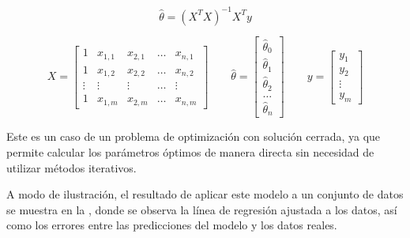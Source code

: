 \begin{equation}
    \label{eq:ols}
        \hat{\theta} = \left(X^T X\right)^{-1} X^T y
\end{equation}

\begin{equation}
    \label{eq:ols_matrices}
      X =
        \begin{bmatrix}
        1 & x_{1,1} & x_{2,1} & \dots & x_{n,1} \\
        1 & x_{1,2} & x_{2,2} & \dots & x_{n,2} \\
        \vdots & \vdots & \vdots & \dots & \vdots \\
        1 & x_{1,m} & x_{2,m} & \dots & x_{n,m}
        \end{bmatrix}
      \quad \quad
      \hat{\theta} =
        \begin{bmatrix}
          \hat{\theta}_0 \\ \hat{\theta}_1 \\ \hat{\theta}_2 \\ \dots \\ \hat{\theta}_n
        \end{bmatrix}
      \quad \quad
      y = \begin{bmatrix} y_1 \\ y_2 \\ \vdots \\ y_m \end{bmatrix}
    \end{equation}

Este es un caso de un problema de optimización con solución cerrada, ya que permite calcular los parámetros óptimos de manera directa sin necesidad de utilizar métodos iterativos.

A modo de ilustración, el resultado de aplicar este modelo a un conjunto de datos se muestra en la , donde se observa la línea de regresión ajustada a los datos, así como los errores entre las predicciones del modelo y los datos reales.

